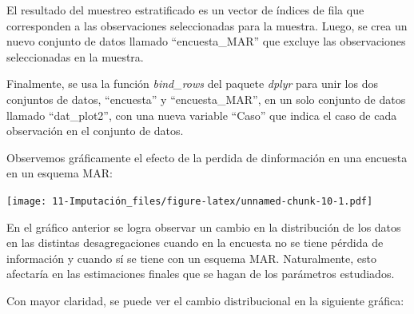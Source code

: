 \documentclass[
  12pt,
]{book}
\newenvironment{Shaded}{\begin{snugshade}}{\end{snugshade}}
\newcommand{\AttributeTok}[1]{\textcolor[rgb]{0.77,0.63,0.00}{#1}}
\newcommand{\FunctionTok}[1]{\textcolor[rgb]{0.00,0.00,0.00}{#1}}
\newcommand{\NormalTok}[1]{#1}
\newcommand{\OtherTok}[1]{\textcolor[rgb]{0.56,0.35,0.01}{#1}}
\newcommand{\SpecialCharTok}[1]{\textcolor[rgb]{0.00,0.00,0.00}{#1}}
\newcommand{\StringTok}[1]{\textcolor[rgb]{0.31,0.60,0.02}{#1}}
\begin{document}
El resultado del muestreo estratificado es un vector de índices de fila que corresponden a las observaciones seleccionadas para la muestra. Luego, se crea un nuevo conjunto de datos llamado ``encuesta\_MAR'' que excluye las observaciones seleccionadas en la muestra.

Finalmente, se usa la función \emph{bind\_rows} del paquete \emph{dplyr} para unir los dos conjuntos de datos, ``encuesta'' y ``encuesta\_MAR'', en un solo conjunto de datos llamado ``dat\_plot2'', con una nueva variable ``Caso'' que indica el caso de cada observación en el conjunto de datos.

Observemos gráficamente el efecto de la perdida de dinformación en una encuesta en un esquema MAR:

\begin{Shaded}
\end{Shaded}

\texttt{[image: 11-Imputación\_files/figure-latex/unnamed-chunk-10-1.pdf]}

En el gráfico anterior se logra observar un cambio en la distribución de los datos en las distintas desagregaciones cuando en la encuesta no se tiene pérdida de información y cuando sí se tiene con un esquema MAR. Naturalmente, esto afectaría en las estimaciones finales que se hagan de los parámetros estudiados.

Con mayor claridad, se puede ver el cambio distribucional en la siguiente gráfica:
\end{document}
